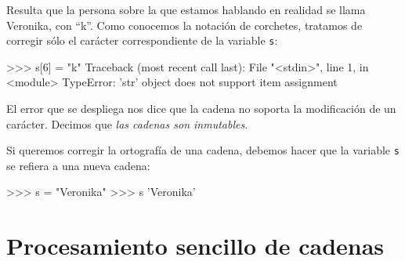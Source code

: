 Resulta que la persona sobre la que estamos hablando en realidad se llama
Veronika, con ``k''.  Como conocemos la notación de corchetes,
tratamos de corregir sólo el carácter correspondiente de la variable
\lstinline!s!:

\begin{codigo-python-sn}
>>> s[6] = "k"
Traceback (most recent call last):
  File "<stdin>", line 1, in <module>
TypeError: 'str' object does not support item assignment
\end{codigo-python-sn}

El error que se despliega nos dice que la cadena no soporta
la modificación de un carácter. Decimos que \emph{las cadenas
son inmutables}.

Si queremos corregir la ortografía de una cadena, debemos hacer
que la variable \lstinline!s! se refiera a una nueva cadena:

\begin{codigo-python-sn}
>>> s = "Veronika"
>>> s
'Veronika'
\end{codigo-python-sn}

\section{Procesamiento sencillo de cadenas}


